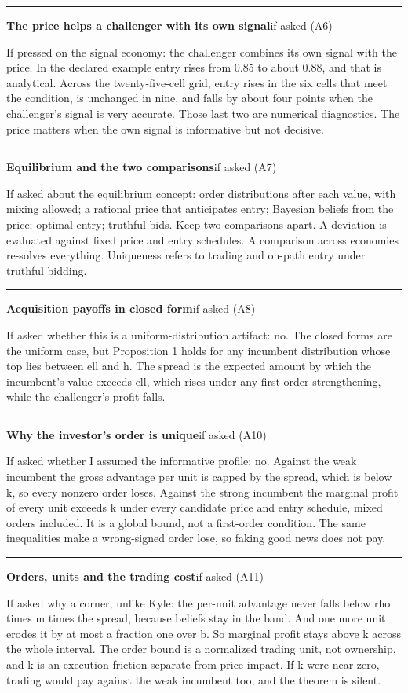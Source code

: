 \documentclass[11pt]{article}
\newcommand{\scriptframe}[3]{%
  \Needspace{9\baselineskip}%
  \par\medskip\noindent\textcolor{ScriptBlue}{\rule{\linewidth}{0.55pt}}%
  \par\smallskip\noindent
  \textbf{#1}\hfill\textcolor{ScriptGray}{\small #2}\par\smallskip
  #3\par}
\begin{document}
\scriptframe{The price helps a challenger with its own signal}{if asked (A6)}{%
  If pressed on the signal economy: the challenger combines its own signal with
  the price. In the declared example entry rises from 0.85 to about 0.88, and
  that is analytical.
  Across the twenty-five-cell grid, entry rises in the six cells that meet the
  condition, is unchanged in nine, and falls by about four points when the
  challenger's signal is very accurate. Those last two are numerical
  diagnostics. The price matters when the own signal is informative but not
  decisive.
}

\scriptframe{Equilibrium and the two comparisons}{if asked (A7)}{%
  If asked about the equilibrium concept: order distributions after each value,
  with mixing allowed; a rational price that anticipates entry; Bayesian beliefs
  from the price; optimal entry; truthful bids. Keep two comparisons apart. A
  deviation is evaluated against fixed price and entry schedules. A comparison
  across economies re-solves everything. Uniqueness refers to trading and
  on-path entry under truthful bidding.
}

\scriptframe{Acquisition payoffs in closed form}{if asked (A8)}{%
  If asked whether this is a uniform-distribution artifact: no. The closed forms
  are the uniform case, but Proposition 1 holds for any incumbent distribution
  whose top lies between ell and h. The spread is the expected amount by which
  the incumbent's value exceeds ell, which rises under any first-order
  strengthening, while the challenger's profit falls.
}

\scriptframe{Why the investor's order is unique}{if asked (A10)}{%
  If asked whether I assumed the informative profile: no. Against the weak
  incumbent the gross advantage per unit is capped by the spread, which is below
  k, so every nonzero order loses. Against the strong incumbent the marginal
  profit of every unit exceeds k under every candidate price and entry schedule,
  mixed orders included. It is a global bound, not a first-order condition. The
  same inequalities make a wrong-signed order lose, so faking good news does not
  pay.
}

\scriptframe{Orders, units and the trading cost}{if asked (A11)}{%
  If asked why a corner, unlike Kyle: the per-unit advantage never falls below
  rho times m times the spread, because beliefs stay in the band. And one more
  unit erodes it by at most a fraction one over b. So marginal profit stays above
  k across the whole interval. The order bound is a normalized trading unit, not
  ownership, and k is an execution friction separate from price impact. If k
  were near zero, trading would pay against the weak incumbent too, and the
  theorem is silent.
}
\end{document}
